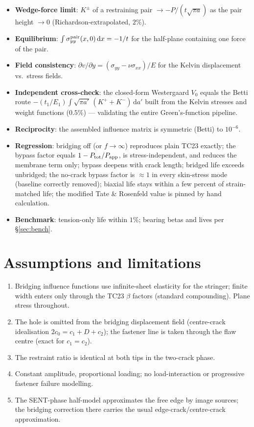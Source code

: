 \documentclass[11pt]{article}
\begin{document}
\begin{itemize}
\item \textbf{Wedge-force limit}: $K^{\pm}$ of a restraining pair
  $\to -P/(t\sqrt{\pi a})$ as the pair height $\to0$ (Richardson-extrapolated,
  $2\%$).
\item \textbf{Equilibrium}: $\int\sigma^{\rm pair}_{yy}(x,0)\,\mathrm{d}x=-1/t$
  for the half-plane containing one force of the pair.
\item \textbf{Field consistency}: $\partial v/\partial y=
  (\sigma_{yy}-\nu\sigma_{xx})/E$ for the Kelvin displacement vs.\ stress
  fields.
\item \textbf{Independent cross-check}: the closed-form Westergaard $V_0$
  equals the Betti route
  $-(t_1/E_1)\int\sqrt{\pi a'}\,(K^++K^-)\,\mathrm{d}a'$ built from the
  Kelvin stresses and weight functions ($0.5\%$) --- validating the entire
  Green's-function pipeline.
\item \textbf{Reciprocity}: the assembled influence matrix is symmetric
  (Betti) to $10^{-6}$.
\item \textbf{Regression}: bridging off (or $f\to\infty$) reproduces plain
  TC23 exactly; the bypass factor equals $1-P_{\rm tot}/P_{\rm app}$, is
  stress-independent, and reduces the membrane term only; bypass deepens with
  crack length; bridged life exceeds unbridged; the no-crack bypass factor is
  $\approx1$ in every skin-stress mode (baseline correctly removed); biaxial
  life stays within a few percent of strain-matched life; the modified
  Tate \& Rosenfeld value is pinned by hand calculation.
\item \textbf{Benchmark}: tension-only life within $1\%$; bearing betas and
  lives per \S\ref{sec:bench}.
\end{itemize}

\section{Assumptions and limitations}

\begin{enumerate}
\item Bridging influence functions use infinite-sheet elasticity for the
  stringer; finite width enters only through the TC23 $\beta$ factors
  (standard compounding). Plane stress throughout.
\item The hole is omitted from the bridging displacement field (centre-crack
  idealisation $2c_0=c_1+D+c_2$); the fastener line is taken through the
  flaw centre (exact for $c_1=c_2$).
\item The restraint ratio is identical at both tips in the two-crack phase.
\item Constant amplitude, proportional loading; no load-interaction or
  progressive fastener failure modelling.
\item The SENT-phase half-model approximates the free edge by image sources;
  the bridging correction there carries the usual edge-crack/centre-crack
  approximation.
\end{enumerate}
\end{document}
